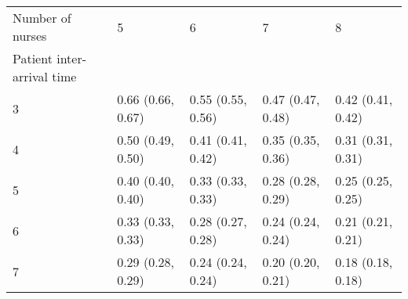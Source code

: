 \begin{tabular}{lllll}
\toprule
Number of nurses & 5 & 6 & 7 & 8 \\
Patient inter-arrival time &  &  &  &  \\
\midrule
3 & 0.66 (0.66, 0.67) & 0.55 (0.55, 0.56) & 0.47 (0.47, 0.48) & 0.42 (0.41, 0.42) \\
4 & 0.50 (0.49, 0.50) & 0.41 (0.41, 0.42) & 0.35 (0.35, 0.36) & 0.31 (0.31, 0.31) \\
5 & 0.40 (0.40, 0.40) & 0.33 (0.33, 0.33) & 0.28 (0.28, 0.29) & 0.25 (0.25, 0.25) \\
6 & 0.33 (0.33, 0.33) & 0.28 (0.27, 0.28) & 0.24 (0.24, 0.24) & 0.21 (0.21, 0.21) \\
7 & 0.29 (0.28, 0.29) & 0.24 (0.24, 0.24) & 0.20 (0.20, 0.21) & 0.18 (0.18, 0.18) \\
\bottomrule
\end{tabular}
